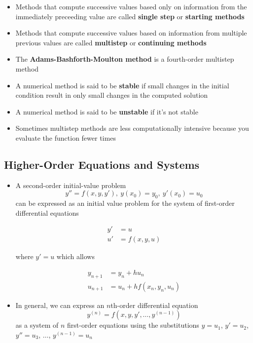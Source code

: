 \documentclass{article}
\begin{document}
\begin{itemize}
  \item Methods that compute successive values based only on information from the immediately preceeding value are called \textbf{single step} or \textbf{starting methods}

  \item Methods that compute successive values based on information from multiple previous values are called \textbf{multistep} or \textbf{continuing methods}

  \item The \textbf{Adams-Bashforth-Moulton method} is a fourth-order multistep method

  \item A numerical method is said to be \textbf{stable} if small changes in the initial condition result in only small changes in the computed solution

  \item A numerical method is said to be \textbf{unstable} if it's not stable

  \item Sometimes multistep methods are less computationally intensive because you evaluate the function fewer times
\end{itemize}

\subsection{Higher-Order Equations and Systems}

\begin{itemize}
  \item A second-order initial-value problem \[y'' = f(x, y, y'), \:y(x_0) = y_0, \:y'(x_0) = u_0\] can be expressed as an initial value problem for the system of first-order differential equations

        \begin{align*}
          y' & = u          \\
          u' & = f(x, y, u)
        \end{align*}

        where $y' = u$ which allows

        \begin{align*}
          y_{n + 1} & = y_n + h u_n              \\
          u_{n + 1} & = u_n + h f(x_n, y_n, u_n)
        \end{align*}

  \item In general, we can express an $n$th-order differential equation \[y^{(n)} = f(x, y, y', \ldots, y^{(n - 1)})\] as a system of $n$ first-order equations using the substitutions $y = u_1$, $y' = u_2$, $y'' = u_3$, $\ldots$, $y^{(n - 1)} = u_n$
\end{itemize}
\end{document}
